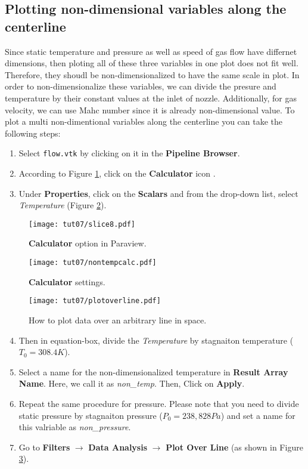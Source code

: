 \subsection{Plotting non-dimensional variables along the centerline}
Since static temperature and pressure as well as speed of gas flow have differnet dimensions, then ploting all of these three variables in one plot does not fit well. Therefore, they shoudl be non-dimensionalized to have the same scale in plot. In order to non-dimensionalize these variables, we can divide the presure and temperature by their constant values at the inlet of nozzle. Additionally, for gas velocity, we can use Mahc number since it is already non-dimensional value. To plot a multi non-dimentional variables along the centerline you can take the following steps:
\begin{enumerate}[label=\arabic*)]
	\setcounter{enumi}{0}
	\item Select \texttt{flow.vtk} by clicking on it in the \textbf{Pipeline Browser}.
	\item According to Figure \ref{fig7:calculator}, click on the \textbf{Calculator} icon .
	\item Under \textbf{Properties}, click on the \textbf{Scalars} and from the drop-down list, select \textit{Temperature} (Figure \ref{fig7:calculator2}).	
\end{enumerate}
\begin{figure}[ht]
	\centering
	\texttt{[image: tut07/slice8.pdf]}
	\caption{\textbf{Calculator} option in Paraview.}
	\label{fig7:calculator}
\end{figure}
\begin{figure}[ht]
	\centering
	\texttt{[image: tut07/nontempcalc.pdf]}
	\caption{\textbf{Calculator} settings.}
	\label{fig7:calculator2}
\end{figure}
\begin{figure}[H]
	\centering
	\texttt{[image: tut07/plotoverline.pdf]}
	\caption{How to plot data over an arbitrary line in space.}
	\label{fig7:plot_over_line}
\end{figure}
\begin{enumerate}[label=\arabic*)]
	\setcounter{enumi}{3}
	\item Then in equation-box, divide the \textit{Temperature} by stagnaiton temperature ($T_{0}=308.4 K$).
	\item Select a name for the non-dimensionalized temperature in \textbf{Result Array Name}. Here, we call it as \textit{non\_temp}. Then, Click on \textbf{Apply}.
	\item Repeat the same procedure for pressure. Please note that you need to divide static pressure by stagnaiton pressure ($P_{0}=238,828 Pa$) and set a name for this valriable as \textit{non\_pressure}.
	\item Go to \textbf{Filters} $\rightarrow$  \textbf{Data Analysis} $\rightarrow$  \textbf{Plot Over Line} (as shown in Figure \ref{fig7:plot_over_line}).
\end{enumerate}
